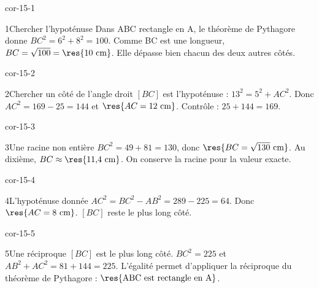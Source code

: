 \clearpage\pagestyle{otMain}\setlength{\otBlocEspacement}{2.5mm}\fontsize{11}{15}\selectfont{}
\begin{blocLivre}{cor-15-1}\begin{corrige}{1}{Chercher l’hypoténuse}
Dans ABC rectangle en A, le théorème de Pythagore donne $BC^2=6^2+8^2=100$. Comme BC est une longueur, $BC=\sqrt{100}=\res{10\ \mathrm{cm}}$. Elle dépasse bien chacun des deux autres côtés.
\label{fig-cor-15-1}
\end{corrige}\end{blocLivre}
\begin{blocLivre}{cor-15-2}\begin{corrige}{2}{Chercher un côté de l’angle droit}
$[BC]$ est l’hypoténuse : $13^2=5^2+AC^2$. Donc $AC^2=169-25=144$ et $\res{AC=12\ \mathrm{cm}}$. Contrôle : $25+144=169$.
\label{fig-cor-15-2}
\end{corrige}\end{blocLivre}
\begin{blocLivre}{cor-15-3}\begin{corrige}{3}{Une racine non entière}
$BC^2=49+81=130$, donc $\res{BC=\sqrt{130}\ \mathrm{cm}}$. Au dixième, $BC\approx\res{11{,}4\ \mathrm{cm}}$. On conserve la racine pour la valeur exacte.
\label{fig-cor-15-3}
\end{corrige}\end{blocLivre}
\begin{blocLivre}{cor-15-4}\begin{corrige}{4}{L’hypoténuse donnée}
$AC^2=BC^2-AB^2=289-225=64$. Donc $\res{AC=8\ \mathrm{cm}}$. $[BC]$ reste le plus long côté.
\label{fig-cor-15-4}
\end{corrige}\end{blocLivre}
\begin{blocLivre}{cor-15-5}\begin{corrige}{5}{Une réciproque}
$[BC]$ est le plus long côté. $BC^2=225$ et $AB^2+AC^2=81+144=225$. L’égalité permet d’appliquer la réciproque du théorème de Pythagore : $\res{\text{ABC est rectangle en A}}$.
\label{fig-cor-15-5}
\end{corrige}\end{blocLivre}

